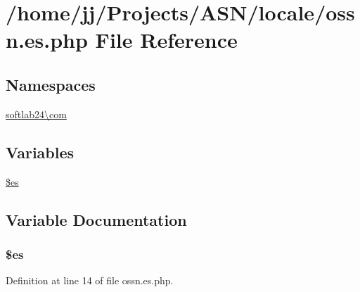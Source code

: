 \hypertarget{locale_2ossn_8es_8php}{}\section{/home/jj/\+Projects/\+A\+S\+N/locale/ossn.es.\+php File Reference}
\label{locale_2ossn_8es_8php}
\subsection*{Namespaces}
\begin{DoxyCompactItemize}
\item 
 \hyperlink{namespacesoftlab24_1_1com}{softlab24\textbackslash{}com}
\end{DoxyCompactItemize}
\subsection*{Variables}
\begin{DoxyCompactItemize}
\item 
\hyperlink{locale_2ossn_8es_8php_a388cbda27103d2baee3997798d1f2744}{\$es}
\end{DoxyCompactItemize}


\subsection{Variable Documentation}
\subsubsection[{\texorpdfstring{\$es}{$es}}]{\setlength{\rightskip}{0pt plus 5cm}\$es}\hypertarget{locale_2ossn_8es_8php_a388cbda27103d2baee3997798d1f2744}{}\label{locale_2ossn_8es_8php_a388cbda27103d2baee3997798d1f2744}


Definition at line 14 of file ossn.\+es.\+php.

